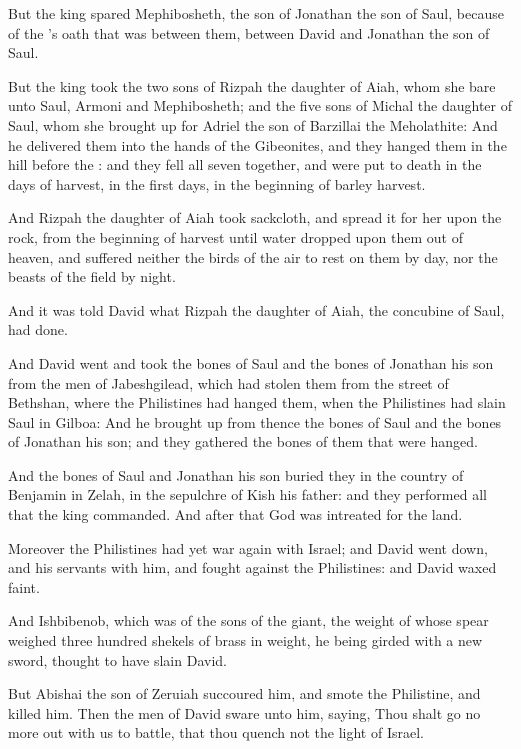 \Verse But the king spared Mephibosheth, the son of Jonathan the son of Saul, because of the \LORD's oath that was between them, between David and Jonathan the son of Saul.

\Verse But the king took the two sons of Rizpah the daughter of Aiah, whom she bare unto Saul, Armoni and Mephibosheth; and the five sons of Michal the daughter of Saul, whom she brought up for Adriel the son of Barzillai the Meholathite: \Verse And he delivered them into the hands of the Gibeonites, and they hanged them in the hill before the \LORD: and they fell all seven together, and were put to death in the days of harvest, in the first days, in the beginning of barley harvest.

\Verse And Rizpah the daughter of Aiah took sackcloth, and spread it for her upon the rock, from the beginning of harvest until water dropped upon them out of heaven, and suffered neither the birds of the air to rest on them by day, nor the beasts of the field by night.

\Verse And it was told David what Rizpah the daughter of Aiah, the concubine of Saul, had done.

\Verse And David went and took the bones of Saul and the bones of Jonathan his son from the men of Jabeshgilead, which had stolen them from the street of Bethshan, where the Philistines had hanged them, when the Philistines had slain Saul in Gilboa: \Verse And he brought up from thence the bones of Saul and the bones of Jonathan his son; and they gathered the bones of them that were hanged.

\Verse And the bones of Saul and Jonathan his son buried they in the country of Benjamin in Zelah, in the sepulchre of Kish his father: and they performed all that the king commanded. And after that God was intreated for the land.

\Verse Moreover the Philistines had yet war again with Israel; and David went down, and his servants with him, and fought against the Philistines: and David waxed faint.

\Verse And Ishbibenob, which was of the sons of the giant, the weight of whose spear weighed three hundred shekels of brass in weight, he being girded with a new sword, thought to have slain David.

\Verse But Abishai the son of Zeruiah succoured him, and smote the Philistine, and killed him. Then the men of David sware unto him, saying, Thou shalt go no more out with us to battle, that thou quench not the light of Israel.

